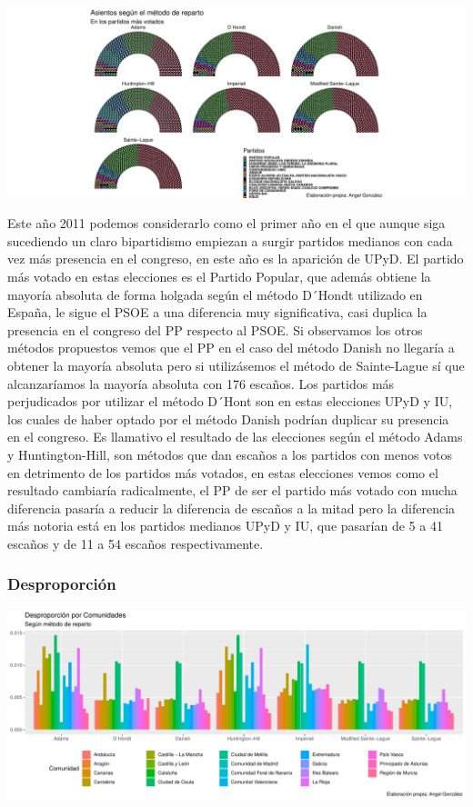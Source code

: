 \documentclass[12pt,a4paper,]{book}
\numberwithin{dummy}{section}
\theoremstyle{ocrenumbox}
\theoremstyle{blacknumex}
\theoremstyle{blacknumbox}
\theoremstyle{ocrenum}
\theoremstyle{ocrenum}
\begin{document}
\begin{center}\includegraphics[width=0.95\linewidth]{figurasR/unnamed-chunk-149-3} \end{center}

Este año 2011 podemos considerarlo como el primer año en el que aunque
siga sucediendo un claro bipartidismo empiezan a surgir partidos
medianos con cada vez más presencia en el congreso, en este año es la
aparición de UPyD. El partido más votado en estas elecciones es el
Partido Popular, que además obtiene la mayoría absoluta de forma holgada
según el método D´Hondt utilizado en España, le sigue el PSOE a una
diferencia muy significativa, casi duplica la presencia en el congreso
del PP respecto al PSOE. Si observamos los otros métodos propuestos
vemos que el PP en el caso del método Danish no llegaría a obtener la
mayoría absoluta pero si utilizásemos el método de Sainte-Lague sí que
alcanzaríamos la mayoría absoluta con 176 escaños. Los partidos más
perjudicados por utilizar el método D´Hont son en estas elecciones UPyD
y IU, los cuales de haber optado por el método Danish podrían duplicar
su presencia en el congreso. Es llamativo el resultado de las elecciones
según el método Adams y Huntington-Hill, son métodos que dan escaños a
los partidos con menos votos en detrimento de los partidos más votados,
en estas elecciones vemos como el resultado cambiaría radicalmente, el
PP de ser el partido más votado con mucha diferencia pasaría a reducir
la diferencia de escaños a la mitad pero la diferencia más notoria está
en los partidos medianos UPyD y IU, que pasarían de 5 a 41 escaños y de
11 a 54 escaños respectivamente.

\hypertarget{desproporciuxf3n-10}{%
\subsubsection{Desproporción}\label{desproporciuxf3n-10}}

\begin{center}\includegraphics[width=0.95\linewidth]{figurasR/unnamed-chunk-150-1} \end{center}
\end{document}

